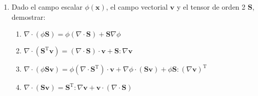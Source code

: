 \documentclass[12pt,a4paper]{article}
\begin{document}
\begin{enumerate}
\begin{enumerate}
    \end{enumerate}
    \item Dado el campo escalar $\phi(\mathbf{x})$, el campo vectorial $\mathbf{v}$ y el tensor de orden 2 $\mathbf{S}$, demostrar:
    \begin{enumerate}
        \item $\nabla\cdot (\phi\mathbf{S}) = \phi(\nabla\cdot \mathbf{S}) + \mathbf{S} \nabla\phi$
        \item $\nabla\cdot (\mathbf{S}^\mathrm{T}\mathbf{v}) = (\nabla\cdot \mathbf{S})\cdot \mathbf{v} + \mathbf{S}: \nabla\mathbf{v}$
        \item $\nabla\cdot (\phi\mathbf{S}\mathbf{v}) = \phi(\nabla\cdot \mathbf{S}^\mathrm{T})\cdot \mathbf{v} + \nabla\phi\cdot (\mathbf{S}\mathbf{v}) + \phi\mathbf{S}: (\nabla\mathbf{v})^\mathrm{T}$
        \item $\nabla\cdot (\mathbf{S}\mathbf{v}) = \mathbf{S}^\mathrm{T}: \nabla\mathbf{v} + \mathbf{v} \cdot (\nabla\cdot \mathbf{S})$

    \end{enumerate}
\end{enumerate}
\end{document}
